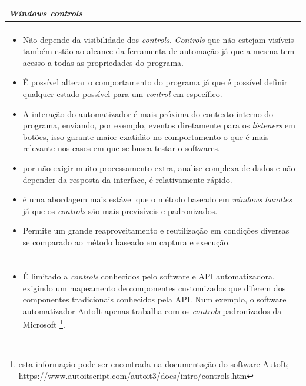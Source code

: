 \documentclass[tg]{mdtufsm}
\begin{document}
{                \begin{tabularx}{\textwidth}{|*{1}{>{\centering\arraybackslash}X}|}
                    \hline
                    \emph{Windows controls} \\
                    \hline
                    {\bf Prós:} \\
                    \begin{itemize}
                        \item Não depende da visibilidade dos \emph{controls}. \emph{Controls} que não estejam visíveis também estão ao alcance da ferramenta de automação já que a mesma tem acesso a todas as propriedades do programa.
                        \item É possível alterar o comportamento do programa já que é possível definir qualquer estado possível para um \emph{control} em específico.
                        \item A interação do automatizador é mais próxima do contexto interno do programa, enviando, por exemplo, eventos diretamente para os \emph{listeners} em botões, isso garante maior exatidão no comportamento o que é mais relevante nos casos em que se busca testar o softwares.
                        \item por não exigir muito processamento extra, analise complexa de dados e não depender da resposta da interface, é relativamente rápido.
                        \item é uma abordagem mais estável que o método baseado em \emph{windows handles} já que os \emph{controls} são mais previsíveis e padronizados.
                        \item Permite um grande reaproveitamento e reutilização em condições diversas se comparado ao método baseado em captura e execução.
                    \end{itemize}
                    \\ {\bf contras:} \\
                    \begin{itemize}
                        \item É limitado a \emph{controls} conhecidos pelo software e API automatizadora, exigindo um mapeamento de componentes customizados que diferem dos componentes tradicionais conhecidos pela API. Num exemplo, o software automatizador AutoIt apenas trabalha com os \emph{controls} padronizados da Microsoft \footnote{esta informação pode ser encontrada na documentação do software AutoIt; https://www.autoitscript.com/autoit3/docs/intro/controls.htm}.

\end{itemize}
\end{tabularx}}
\end{document}

